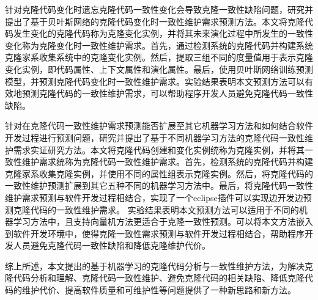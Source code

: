 {针对克隆代码变化时遗忘克隆代码一致性变化会导致克隆一致性缺陷问题，研究并提出了基于贝叶斯网络的克隆代码变化时一致性维护需求预测方法。本文将克隆代码发生变化的克隆代码称为克隆变化实例，并将其未来演化过程中所发生的一致性变化称为克隆变化时一致性维护需求。首先，通过检测系统的克隆代码并构建系统克隆家系收集系统中的克隆变化实例。然后，提取三组不同的度量值用于表示克隆变化实例，即代码属性、上下文属性和演化属性。最后，使用贝叶斯网络训练预测模型，并预测克隆代码变化时一致性维护需求。实验结果表明本文预测方法可以有效地预测克隆代码的一致性维护需求，可以帮助程序开发人员避免克隆代码一致性缺陷。


针对在克隆代码一致性维护需求预测能否扩展至其它机器学习方法和如何结合软件开发过程进行预测问题，研究并提出了基于不同机器学习方法的克隆代码一致性维护需求实证研究方法。本文将克隆代码创建和变化实例统称为克隆实例，并将其一致性维护需求统称为克隆代码一致性维护需求。首先，检测系统的克隆代码并构建克隆家系收集克隆实例，并使用不同的属性组表示克隆实例。然后，将克隆代码的一致性维护预测扩展到其它五种不同的机器学习方法中。最后，将克隆代码一致性维护需求预测与软件开发过程相结合，实现了一个eclipse插件可以实现边开发边预测克隆代码的一致性维护需求。 实验结果表明本文预测方法可以适用于不同的机器学习方法中，且支持向量机方法更适合于克隆一致性预测。可以将本文方法嵌入到软件开发环境中，使得克隆一致性需求预测与软件开发过程相结合，帮助程序开发人员避免克隆代码一致性缺陷和降低克隆维护代价。%

综上所述，本文提出的基于机器学习的克隆代码分析与一致性维护方法，为解决克隆代码分析和理解、克隆代码一致性维护、避免克隆代码的相关缺陷、降低克隆代码的维护代价、提高软件质量和可维护性等问题提供了一种新思路和新方法。
}


